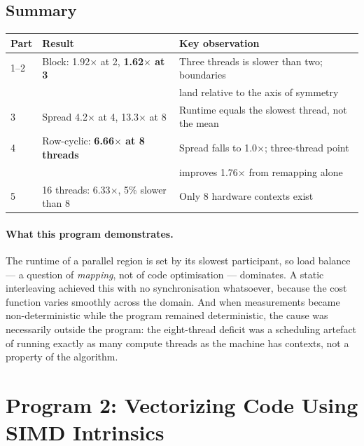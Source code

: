 \documentclass[11pt,a4paper]{article}
\begin{document}
\subsection{Summary}

\begin{table}[H]
\centering
\begin{tabular}{lll}
\toprule
Part & Result & Key observation \\
\midrule
1--2 & Block: 1.92$\times$ at 2, \textbf{1.62$\times$ at 3} & Three threads is slower
       than two; boundaries \\
     & & land relative to the axis of symmetry \\
3    & Spread 4.2$\times$ at 4, 13.3$\times$ at 8 & Runtime equals the slowest thread,
       not the mean \\
4    & Row-cyclic: \textbf{6.66$\times$ at 8 threads} & Spread falls to 1.0$\times$;
       three-thread point \\
     & & improves 1.76$\times$ from remapping alone \\
5    & 16 threads: 6.33$\times$, 5\% slower than 8 & Only 8 hardware contexts exist \\
\bottomrule
\end{tabular}
\end{table}

\paragraph{What this program demonstrates.} The runtime of a parallel region is
set by its slowest participant, so load balance --- a question of
\emph{mapping}, not of code optimisation --- dominates. A static interleaving
achieved this with no synchronisation whatsoever, because the cost function
varies smoothly across the domain. And when measurements became
non-deterministic while the program remained deterministic, the cause was
necessarily outside the program: the eight-thread deficit was a scheduling
artefact of running exactly as many compute threads as the machine has
contexts, not a property of the algorithm.

\section{Program 2: Vectorizing Code Using SIMD Intrinsics}
\end{document}
